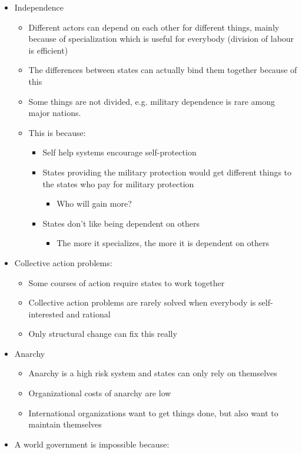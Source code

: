 \documentclass[11pt]{article}
\begin{document}
\begin{itemize}
\item Independence
\begin{itemize}
\item Different actors can depend on each other for different things, mainly
because of specialization which is useful for everybody (division of labour
is efficient)
\item The differences between states can actually bind them together because of
this
\item Some things are not divided, e.g. military dependence is rare among major
nations.
\item This is because:
\begin{itemize}
\item Self help systems encourage self-protection
\item States providing the military protection would get different things to the
states who pay for military protection
\begin{itemize}
\item Who will gain more?
\end{itemize}
\item States don't like being dependent on others
\begin{itemize}
\item The more it specializes, the more it is dependent on others
\end{itemize}
\end{itemize}
\end{itemize}
\item Collective action problems:
\begin{itemize}
\item Some courses of action require states to work together
\item Collective action problems are rarely solved when everybody is
self-interested and rational
\item Only structural change can fix this really
\end{itemize}
\item Anarchy
\begin{itemize}
\item Anarchy is a high risk system and states can only rely on themselves
\item Organizational costs of anarchy are low
\item International organizations want to get things done, but also want to
maintain themselves
\end{itemize}
\item A world government is impossible because:

\end{itemize}
\end{document}
